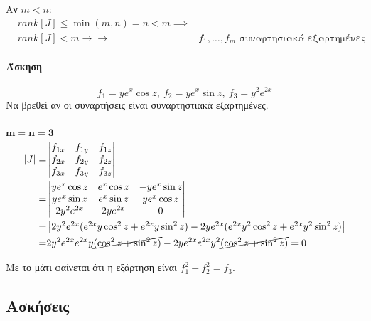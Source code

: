 \documentclass[11pt,a4paper,titlepage]{article}
\begin{document}
Αν \(m<n\):
\begin{align*}
&rank[J] \leq \min(m,n) = n <m \implies\\&
rank[J]<m \rightarrow \rightarrow&f_1,\dots,f_m \text{ συναρτησιακά εξαρτημένες}
\end{align*}

\paragraph{Άσκηση}
\[f_1=ye^x\cos z,\ f_2=ye^x\sin z,\ f_3=y^2e^{2x}\]
Να βρεθεί αν οι συναρτήσεις είναι συναρτηστιακά εξαρτημένες.

\subparagraph{}
\(\mathbf{m=n=3}\)
\begin{align*}
|J|=&\left|
\begin{matrix}
f_{1x}&f_{1y}&f_{1z}\\
f_{2x}&f_{2y}&f_{2z}\\
f_{3x}&f_{3y}&f_{3z}
\end{matrix}
\right|\\
=&\left|
\begin{matrix}
ye^x\cos z&e^x\cos z&-ye^x\sin z\\
ye^x\sin z&e^x\sin z & ye^x\cos z\\
2y^2e^{2x}&2ye^{2x}&0
\end{matrix}
\right|\\
=&\left|
\begin{matrix}
2y^2e^{2x}(e^{2x}y\cos^2 z +e^{2x}y\sin^2z)
-2ye^{2x}(e^{2x}y^2\cos^2z+e^{2x}y^2\sin^2 z)
\end{matrix}
\right|
\\=&
2y^2e^{2x}e^{2x}y\cancel{(\cos^2 z+\sin^2 z)}-2ye^{2x}e^{2x}y^2\cancel{(\cos^2 z + \sin^2 z)}=0
\end{align*}

Με το μάτι φαίνεται ότι η εξάρτηση είναι \(f_1^2+f_2^2=f_3\).


\subsection{Ασκήσεις}
\end{document}
